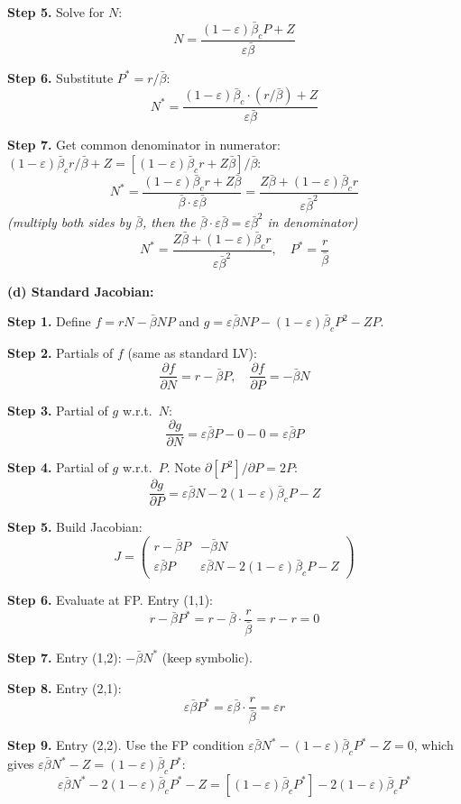 \documentclass[10pt]{article}
\newcommand{\stepwhy}[1]{\textcolor{blue!60!black}{\small\textit{(#1)}}}
\begin{document}
\begin{solution}
\textbf{Step 5.} Solve for $N$:
\[
N = \frac{(1-\varepsilon)\bar\beta_c P + Z}{\varepsilon\bar\beta}
\]

\textbf{Step 6.} Substitute $P^* = r/\bar\beta$:
\[
N^* = \frac{(1-\varepsilon)\bar\beta_c\cdot(r/\bar\beta) + Z}{\varepsilon\bar\beta}
\]

\textbf{Step 7.} Get common denominator in numerator: $(1-\varepsilon)\bar\beta_c r/\bar\beta + Z = [(1-\varepsilon)\bar\beta_c r + Z\bar\beta]/\bar\beta$:
\[
N^* = \frac{(1-\varepsilon)\bar\beta_c r + Z\bar\beta}{\bar\beta\cdot\varepsilon\bar\beta} = \frac{Z\bar\beta + (1-\varepsilon)\bar\beta_c r}{\varepsilon\bar\beta^2}
\]
\stepwhy{multiply both sides by $\bar\beta$, then the $\bar\beta\cdot\varepsilon\bar\beta = \varepsilon\bar\beta^2$ in denominator}
\[
\boxed{N^* = \frac{Z\bar\beta + (1-\varepsilon)\bar\beta_c r}{\varepsilon\bar\beta^2}, \quad P^* = \frac{r}{\bar\beta}}
\]

\medskip\textbf{(d) Standard Jacobian:}

\textbf{Step 1.} Define $f = rN - \bar\beta NP$ and $g = \varepsilon\bar\beta NP - (1-\varepsilon)\bar\beta_c P^2 - ZP$.

\textbf{Step 2.} Partials of $f$ (same as standard LV):
\[
\frac{\partial f}{\partial N} = r - \bar\beta P, \quad \frac{\partial f}{\partial P} = -\bar\beta N
\]

\textbf{Step 3.} Partial of $g$ w.r.t.\ $N$:
\[
\frac{\partial g}{\partial N} = \varepsilon\bar\beta P - 0 - 0 = \varepsilon\bar\beta P
\]

\textbf{Step 4.} Partial of $g$ w.r.t.\ $P$. Note $\partial[P^2]/\partial P = 2P$:
\[
\frac{\partial g}{\partial P} = \varepsilon\bar\beta N - 2(1-\varepsilon)\bar\beta_c P - Z
\]

\textbf{Step 5.} Build Jacobian:
\[
J = \begin{pmatrix} r - \bar\beta P & -\bar\beta N \\ \varepsilon\bar\beta P & \varepsilon\bar\beta N - 2(1-\varepsilon)\bar\beta_c P - Z \end{pmatrix}
\]

\textbf{Step 6.} Evaluate at FP. Entry (1,1):
\[
r - \bar\beta P^* = r - \bar\beta\cdot\frac{r}{\bar\beta} = r - r = 0
\]

\textbf{Step 7.} Entry (1,2): $-\bar\beta N^*$ (keep symbolic).

\textbf{Step 8.} Entry (2,1):
\[
\varepsilon\bar\beta P^* = \varepsilon\bar\beta\cdot\frac{r}{\bar\beta} = \varepsilon r
\]

\textbf{Step 9.} Entry (2,2). Use the FP condition $\varepsilon\bar\beta N^* - (1-\varepsilon)\bar\beta_c P^* - Z = 0$, which gives $\varepsilon\bar\beta N^* - Z = (1-\varepsilon)\bar\beta_c P^*$:
\[
\varepsilon\bar\beta N^* - 2(1-\varepsilon)\bar\beta_c P^* - Z = [(1-\varepsilon)\bar\beta_c P^*] - 2(1-\varepsilon)\bar\beta_c P^*
\]


\end{solution}
\end{document}
